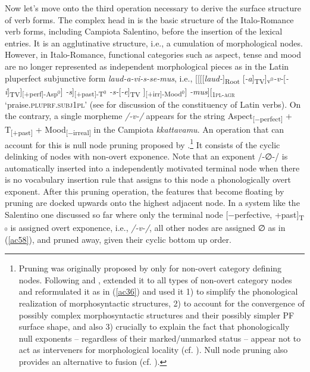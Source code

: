 \documentclass[output=paper]{langscibook}
\begin{document}
Now let's move onto the third operation necessary to derive the surface structure of verb forms. The complex head in   is the basic structure of the Italo-Romance verb forms, including Campiota Salentino, before the insertion of the lexical entries. It is an agglutinative structure, i.e., a cumulation of morphological nodes. However, in Italo-Romance, functional categories such as aspect, tense and mood are no longer represented as independent morphological pieces as in the Latin pluperfect subjunctive form \textit{laud-a-vi-s-se-mus}, i.e., [[[[\textit{laud-}]\textsubscript{Root} [\textit{-a}]\textsubscript{TV}]\textsubscript{v$^0$}\textit{-v-}[\textit{-i}]\textsubscript{TV}]\textsubscript{[+perf]-Asp$^0$}] \textit{-s}]\textsubscript{[+past]-T$^0$} \textit{-s-}[\textit{-e}]\textsubscript{TV} ]\textsubscript{[+irr]-Mood$^0$}] \textit{-mus}][\textsubscript{\textsc{1pl-agr}}  ‘praise.\textsc{plu\-prf}.\textsc{subj}\-\textsc{1pl}’ (see \citealt{calabrese2020} for discussion of the constituency of Latin verbs). On the contrary, a single morpheme \textit{/-v-/} appears for the string Aspect\textsubscript{[−perfect]} + T\textsubscript{[+past]} + Mood\textsubscript{[−irreal]} in the Campiota \textit{kkattavamu}.  An operation that can account for this is null node pruning proposed by \citet{calabrese2019a}.\footnote{Pruning was originally proposed by \citet{embick2010a} only for non-overt category defining nodes. Following \citet{christopoulos2017a} and \citet{christopoulos2018a}, \citet{calabrese2019a} extended it to all types of non-overt category nodes and reformulated it as in (\ref{ac36}) and used it 1) to simplify the phonological realization of morphosyntactic structures, 2) to account for the convergence of possibly complex morphosyntactic structures and their possibly simpler PF surface shape, and also 3) crucially to explain the fact that phonologically null exponents -- regardless of their marked/unmarked status --  appear not to act as interveners for morphological locality (cf. \citealt{embick2010a, calabrese2019a}). Null node pruning also provides an alternative to fusion (cf. \citealt{halle1993a}).}
It consists of the cyclic delinking of nodes with non-overt exponence. Note that an exponent /-∅-/ is automatically  inserted  into a independently motivated  terminal node when there is no vocabulary insertion rule that assigns to this node a phonologically overt exponent.  After this pruning operation, the features that become floating by pruning are docked upwards onto the highest adjacent node.  In a system like the Salentino one discussed so far where only the terminal node [−perfective, +past]\textsubscript{T$^0$} is assigned overt exponence, i.e., \textit{/-v-/}, all other nodes are assigned ∅ as in (\ref{ac58}), and pruned away, given their cyclic bottom up order.
\end{document}

